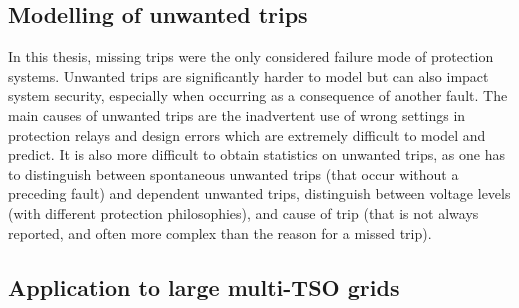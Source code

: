 \subsection*{Modelling of unwanted trips}

In this thesis, missing trips were the only considered failure mode of protection systems. Unwanted trips are significantly harder to model but can also impact system security, especially when occurring as a consequence of another fault. The main causes of unwanted trips are the inadvertent use of wrong settings in protection relays and design errors which are extremely difficult to model and predict. It is also more difficult to obtain statistics on unwanted trips, as one has to distinguish between spontaneous unwanted trips (that occur without a preceding fault) and dependent unwanted trips, distinguish between voltage levels (with different protection philosophies), and cause of trip (that is not always reported, and often more complex than the reason for a missed trip).


\subsection*{Application to large multi-TSO grids}

